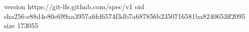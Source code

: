 version https://git-lfs.github.com/spec/v1
oid sha256:e88d4e80c699aa3957a6fd6574f3db7a687856b2350716581ba8240653ff2095
size 173055
